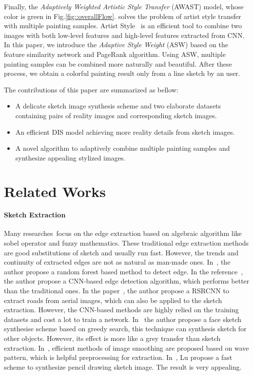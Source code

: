 \documentclass[10pt,twocolumn,letterpaper]{article}
\begin{document}
Finally, the \textit{Adaptively Weighted Artistic Style Transfer} (AWAST) model, whose color is green in Fig.\ref{fig::overallFlow}. solves the problem of artist style transfer with multiple painting samples. Artist Style~\cite{gatys2015neural} is an efficient tool to combine two images with both low-level features and high-level features extracted from CNN. In this paper, we introduce the \textit{Adaptive Style Weight} (ASW) based on the feature similarity network and PageRank algorithm. Using ASW, multiple painting samples can be combined more naturally and beautiful. After these process, we obtain a colorful painting result only from a line sketch by an user.

The contributions of this paper are summarized as bellow:
\begin{itemize}
  \item A delicate sketch image synthesis scheme and two elaborate datasets containing pairs of reality images and corresponding sketch images.
  \item An efficient DIS model achieving more reality details from sketch images.
  \item A novel algorithm to adaptively combine multiple painting samples and synthesize appealing stylized images.
\end{itemize}

\section{Related Works}
\paragraph{\textbf{Sketch Extraction}}
Many researches~\cite{gonzalez2016improved, kumar2017fractional, gao2010improved}focus on the edge extraction based on algebraic algorithm like sobel operator and fuzzy mathematics. These traditional edge extraction methods are good substitutions of sketch and usually run fast. However, the trends and continuity of extracted edges are not as natural as man-made ones. In~\cite{Dollar_2013_ICCV}, the author propose a random forest based method to detect edge. In the reference~\cite{xie15hed}, the author propose a CNN-based edge detection algorithm, which performs better than the traditional ones. In the paper~\cite{wei2017road}, the author propose a RSRCNN to extract roads from aerial images, which can also be applied to the sketch extraction. However, the CNN-based methods are highly relied on the training datasets and cost a lot to train a network. In~\cite{zhang2015face} the author propose a face sketch synthesise scheme based on greedy search, this technique can synthesis sketch for other objects. However, its effect is more like a grey transfer than sketch extraction.
In~\cite{zhang2015segment, xu2011image}, efficient methods of image smoothing are proposed based on wave pattern, which is helpful preprocessing for extraction.
In~\cite{lu2012combining}, Lu propose a fast scheme to synthesize pencil drawing sketch image. The result is very appealing.
\end{document}
